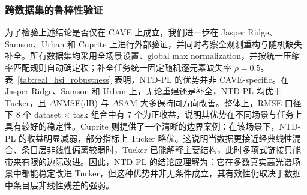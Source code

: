 \subsubsection{跨数据集的鲁棒性验证}

为了检验上述结论是否仅在 CAVE 上成立，我们进一步在 Jasper Ridge、Samson、Urban 和 Cuprite 上进行外部验证，并同时考察全观测重构与随机缺失补全。所有数据集均采用全场景设置、global max normalization，并按统一压缩率匹配规则自动确定秩；补全任务统一固定随机逐元素缺失率 $\rho=0.5$。表~\ref{tab:real_hsi_robustness} 表明，NTD-PL 的优势并非 CAVE-specific。在 Jasper Ridge、Samson 和 Urban 上，无论重建还是补全，NTD-PL 均优于 Tucker，且 $\Delta$NMSE(dB) 与 $\Delta$SAM 大多保持同方向改善。整体上，RMSE 口径下 $8$ 个 dataset $\times$ task 组合中有 $7$ 个为正收益，说明其优势在不同场景与任务上具有较好的稳定性。Cuprite 则提供了一个清晰的边界案例：在该场景下，NTD-PL 的收益明显减弱，部分指标上 Tucker 略优。这说明当数据更接近经典线性混合、条目层非线性偏离较弱时，Tucker 已能解释主要结构，此时多项式链接只能带来有限的边际改进。因此，NTD-PL 的结论应理解为：它在多数真实高光谱场景中都能稳定改进 Tucker，但这种优势并非无条件成立，其有效性仍取决于数据中条目层非线性残差的强弱。

\begin{table}[htbp]
    \centering
    \caption{跨数据集鲁棒性验证主表。Recon. 行中 Tucker / NTD-PL 为 RMSE，Compl. 行中 Tucker / NTD-PL 为 RMSE*；Gain(\%)、$\Delta$NMSE(dB) 与 $\Delta$SAM 统一按 Tucker $-$ NTD-PL 定义，因此正值表示 NTD-PL 更优。}
    \label{tab:real_hsi_robustness}
    \small
    \setlength{\tabcolsep}{4.6pt}
    
\end{table}
